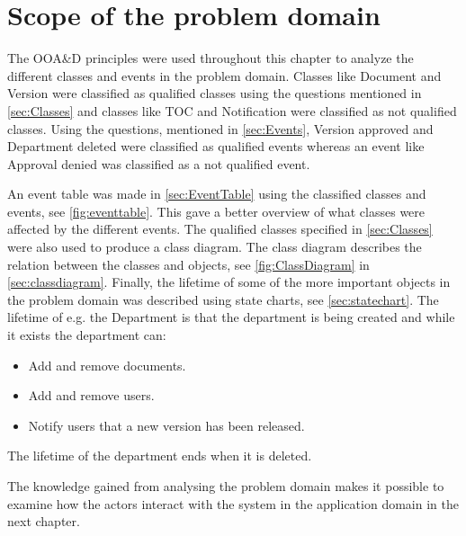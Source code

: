 \section{Scope of the problem domain}

The OOA\&D principles were used throughout this chapter to analyze the different classes and events in the problem domain.
Classes like Document and Version were classified as qualified classes using the questions mentioned in \cref{sec:Classes} and classes like TOC and Notification were classified as not qualified classes.
Using the questions, mentioned in \cref{sec:Events}, Version approved and Department deleted were classified as qualified events whereas an event like Approval denied was classified as a not qualified event.

An event table was made in \cref{sec:EventTable} using the classified classes and events, see \cref{fig:eventtable}.
This gave a better overview of what classes were affected by the different events.
The qualified classes specified in \cref{sec:Classes} were also used to produce a class diagram.
The class diagram describes the relation between the classes and objects, see \cref{fig:ClassDiagram} in \cref{sec:classdiagram}.
Finally, the lifetime of some of the more important objects in the problem domain was described using state charts, see \cref{sec:statechart}.
The lifetime of e.g. the Department is that the department is being created and while it exists the department can:

\begin{itemize}
	\item Add and remove documents.
	\item Add and remove users.
	\item Notify users that a new version has been released.
\end{itemize}

The lifetime of the department ends when it is deleted.

The knowledge gained from analysing the problem domain makes it possible to examine how the actors interact with the system in the application domain in the next chapter.
